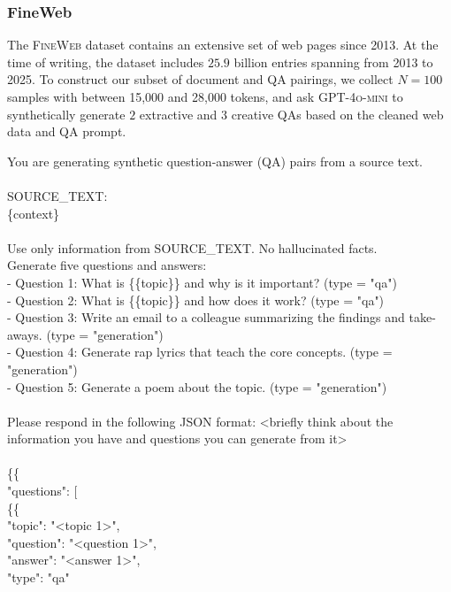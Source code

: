 \documentclass{article} %
\newcommand{\tab}{\hspace*{2em}}
\begin{document}
\subsubsection{FineWeb}
\label{sec:appendix-fineweb}
The \textsc{FineWeb} dataset contains an extensive set of web pages since 2013. At the time of writing, the dataset includes $25.9$ billion entries spanning from 2013 to 2025. To construct our subset of document and QA pairings, we collect $N=100$ samples with between 15{,}000 and 28{,}000 tokens, and ask \textsc{GPT-4o-mini} to synthetically generate $2$ extractive and $3$ creative QAs based on the cleaned web data and QA prompt.

\begin{examplebox}
    \ttfamily
You are generating synthetic question-answer (QA) pairs from a source text.
\\\\
SOURCE\_TEXT:\\
\{context\}
\\\\
Use only information from SOURCE\_TEXT. No hallucinated facts. \\
Generate five questions and answers: \\
- Question 1: What is \{\{topic\}\} and why is it important? (type = "qa") \\
- Question 2: What is \{\{topic\}\} and how does it work? (type = "qa") \\
- Question 3: Write an email to a colleague summarizing the findings and take-aways. (type = "generation") \\
- Question 4: Generate rap lyrics that teach the core concepts. (type = "generation") \\
- Question 5: Generate a poem about the topic. (type = "generation")
\\\\
Please respond in the following JSON format:
<briefly think about the information you have and questions you can generate from it>
\\\\
\{\{ \\
\tab "questions": [ \\
\tab \tab \{\{ \\
\tab \tab \tab"topic": "<topic 1>", \\
\tab \tab \tab"question": "<question 1>", \\
\tab \tab \tab"answer": "<answer 1>", \\
\tab \tab \tab"type": "qa" \\

\end{examplebox}
\end{document}
